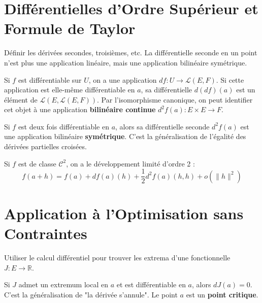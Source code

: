 \section{Différentielles d'Ordre Supérieur et Formule de Taylor}

\begin{objectif}
    Définir les dérivées secondes, troisièmes, etc. La différentielle seconde en un point n'est plus une application linéaire, mais une application bilinéaire symétrique.
\end{objectif}

\begin{definition}
    Si $f$ est différentiable sur $U$, on a une application $df: U \to \mathcal{L}(E,F)$. Si cette application est elle-même différentiable en $a$, sa différentielle $d(df)(a)$ est un élément de $\mathcal{L}(E, \mathcal{L}(E,F))$.
    Par l'isomorphisme canonique, on peut identifier cet objet à une application \textbf{bilinéaire continue} $d^2f(a): E \times E \to F$.
\end{definition}

\begin{theorem}
    Si $f$ est deux fois différentiable en $a$, alors sa différentielle seconde $d^2f(a)$ est une application bilinéaire \textbf{symétrique}. C'est la généralisation de l'égalité des dérivées partielles croisées.
\end{theorem}

\begin{theorem}
    Si $f$ est de classe $\mathcal{C}^2$, on a le développement limité d'ordre 2 :
    $$ f(a+h) = f(a) + df(a)(h) + \frac{1}{2} d^2f(a)(h,h) + o(\|h\|^2) $$
\end{theorem}

\section{Application à l'Optimisation sans Contraintes}

\begin{objectif}
    Utiliser le calcul différentiel pour trouver les extrema d'une fonctionnelle $J: E \to \mathbb{R}$.
\end{objectif}

\begin{proposition}
    Si $J$ admet un extremum local en $a$ et est différentiable en $a$, alors $dJ(a)=0$. C'est la généralisation de "la dérivée s'annule". Le point $a$ est un \textbf{point critique}.
\end{proposition}

